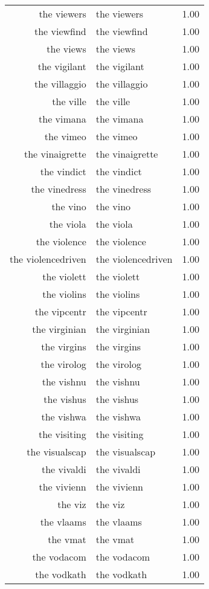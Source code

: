 \begin{table}[ht]
\begin{tabular}{rlr}
  the viewers & the viewers & 1.00 \\ 
  the viewfind & the viewfind & 1.00 \\ 
  the views & the views & 1.00 \\ 
  the vigilant & the vigilant & 1.00 \\ 
  the villaggio & the villaggio & 1.00 \\ 
  the ville & the ville & 1.00 \\ 
  the vimana & the vimana & 1.00 \\ 
  the vimeo & the vimeo & 1.00 \\ 
  the vinaigrette & the vinaigrette & 1.00 \\ 
  the vindict & the vindict & 1.00 \\ 
  the vinedress & the vinedress & 1.00 \\ 
  the vino & the vino & 1.00 \\ 
  the viola & the viola & 1.00 \\ 
  the violence & the violence & 1.00 \\ 
  the violencedriven & the violencedriven & 1.00 \\ 
  the violett & the violett & 1.00 \\ 
  the violins & the violins & 1.00 \\ 
  the vipcentr & the vipcentr & 1.00 \\ 
  the virginian & the virginian & 1.00 \\ 
  the virgins & the virgins & 1.00 \\ 
  the virolog & the virolog & 1.00 \\ 
  the vishnu & the vishnu & 1.00 \\ 
  the vishus & the vishus & 1.00 \\ 
  the vishwa & the vishwa & 1.00 \\ 
  the visiting & the visiting & 1.00 \\ 
  the visualscap & the visualscap & 1.00 \\ 
  the vivaldi & the vivaldi & 1.00 \\ 
  the vivienn & the vivienn & 1.00 \\ 
  the viz & the viz & 1.00 \\ 
  the vlaams & the vlaams & 1.00 \\ 
  the vmat & the vmat & 1.00 \\ 
  the vodacom & the vodacom & 1.00 \\ 
  the vodkath & the vodkath & 1.00 \\ 

\end{tabular}
\end{table}
